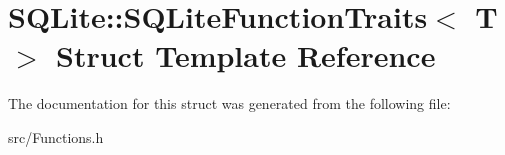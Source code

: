 \hypertarget{struct_s_q_lite_1_1_s_q_lite_function_traits}{\section{S\-Q\-Lite\-:\-:S\-Q\-Lite\-Function\-Traits$<$ T $>$ Struct Template Reference}
\label{struct_s_q_lite_1_1_s_q_lite_function_traits}
}


The documentation for this struct was generated from the following file\-:\begin{DoxyCompactItemize}
\item 
src/Functions.\-h\end{DoxyCompactItemize}

